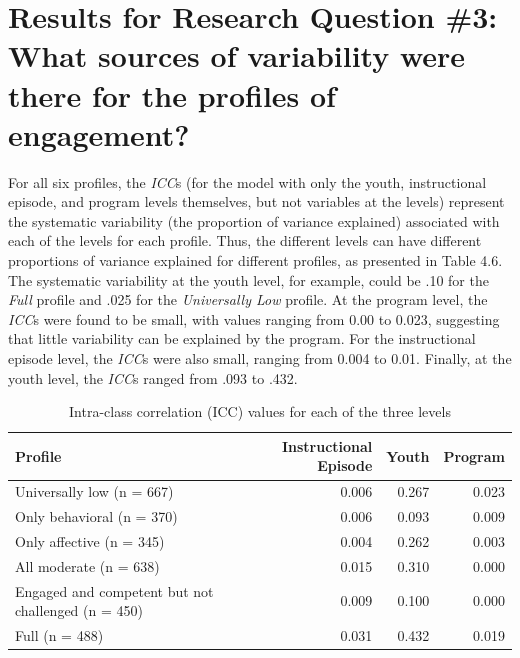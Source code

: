 \documentclass[]{msu-thesis}
\theoremstyle{definition}
\theoremstyle{definition}
\theoremstyle{definition}
\theoremstyle{remark}
\begin{document}
\section{Results for Research Question \#3: What sources of variability
were there for the profiles of
engagement?}\label{results-for-research-question-3-what-sources-of-variability-were-there-for-the-profiles-of-engagement}

For all six profiles, the \emph{ICC}s (for the model with only the
youth, instructional episode, and program levels themselves, but not
variables at the levels) represent the systematic variability (the
proportion of variance explained) associated with each of the levels for
each profile. Thus, the different levels can have different proportions
of variance explained for different profiles, as presented in Table 4.6.
The systematic variability at the youth level, for example, could be .10
for the \emph{Full} profile and .025 for the \emph{Universally Low}
profile. At the program level, the \emph{ICC}s were found to be small,
with values ranging from 0.00 to 0.023, suggesting that little
variability can be explained by the program. For the instructional
episode level, the \emph{ICC}s were also small, ranging from 0.004 to
0.01. Finally, at the youth level, the \emph{ICC}s ranged from .093 to
.432.

\begin{table}

\caption{\label{tab:unnamed-chunk-15}Intra-class correlation (ICC) values for each of the three levels}
\centering
\begin{tabular}[t]{lrrr}
\toprule
Profile & Instructional Episode & Youth & Program\\
\midrule
Universally low (n = 667) & 0.006 & 0.267 & 0.023\\
Only behavioral (n = 370) & 0.006 & 0.093 & 0.009\\
Only affective (n = 345) & 0.004 & 0.262 & 0.003\\
All moderate (n = 638) & 0.015 & 0.310 & 0.000\\
Engaged and competent but not challenged (n = 450) & 0.009 & 0.100 & 0.000\\
Full (n = 488) & 0.031 & 0.432 & 0.019\\
\bottomrule
\end{tabular}
\end{table}
\end{document}
